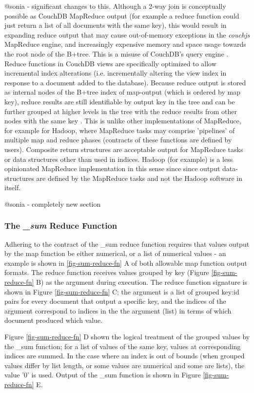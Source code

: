 @sonia - significant changes to this.
Although a 2-way join is conceptually possible as CouchDB MapReduce output (for example a reduce function could just return a list of all documents with the same key), this would result in expanding reduce output that may cause out-of-memory exceptions in the \textit{couchjs} MapReduce engine, and increasingly expensive memory and space usage towards the root node of the B+tree. This is a misuse of CouchDB's query engine \cite{reduceFunctions}. Reduce functions in CouchDB views are specifically optimized to allow incremental index alterations (i.e. incrementally altering the view index in response to a document added to the database). Because reduce output is stored as internal nodes of the B+tree index of map-output (which is ordered by map key), reduce results are still identifiable by output key in the tree and can be further grouped at higher levels in the tree with the reduce results from other nodes with the same key \cite{slack25Oct}. This is unlike other implementations of MapReduce, for example for Hadoop, where MapReduce tasks may comprise 'pipelines' of multiple map and reduce phases (contracts of these functions are defined by users). Composite return structures are acceptable output for MapReduce tasks or data structures other than used in indices. Hadoop (for example) is a less opinionated MapReduce implementation in this sense since since output data-structures are defined by the MapReduce tasks and not the Hadoop software in itself.

@sonia - completely new section
\subsubsection{The \textit{\_sum} Reduce Function}
Adhering to the contract of the \_sum reduce function requires that values output by the map function be either numerical, or a list of numerical values - an example is shown in \ref{fig-sum-reduce-fn} A of both allowable map function output formats. The reduce function receives values grouped by key (Figure \ref{fig-sum-reduce-fn} B) as the  argument during execution. The reduce function signature is shown in Figure \ref{fig-sum-reduce-fn} C; the  argument is a list of grouped key:id pairs for every document that output a specific key, and the indices of the  argument correspond to indices in the the  argument (list) in terms of which document produced which value.

Figure \ref{fig-sum-reduce-fn} D shown the logical treatment of the grouped values by the \_sum function; for a list of values of the same key, values at corresponding indices are summed. In the case where an index is out of bounds (when grouped values differ by list length, or some values are numerical and some are lists), the value '0' is used. Output of the \_sum function is shown in Figure \ref{fig-sum-reduce-fn} E.

